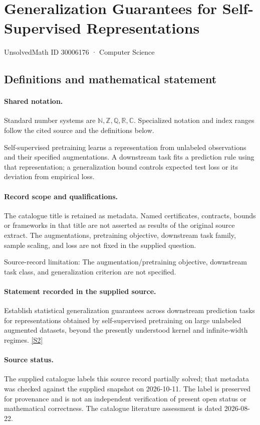 \documentclass[11pt]{article}
\newcommand{\sref}[2]{\hyperlink{source:#1:#2}{[S#2]}}
\begin{document}
\setcounter{section}{30006175}
\section{Generalization Guarantees for Self-Supervised Representations}\label{30006176}
{\small\sffamily UnsolvedMath ID 30006176 · Computer Science}
\subsection{Definitions and mathematical statement}

\paragraph{Shared notation.}Standard number systems are $\mathbb N,\mathbb Z,\mathbb Q,\mathbb R,\mathbb C$. Specialized notation and index ranges follow the cited source and the definitions below.


Self-supervised pretraining learns a representation from unlabeled observations and their specified augmentations. A downstream task fits a prediction rule using that representation; a generalization bound controls expected test loss or its deviation from empirical loss.
\paragraph{Record scope and qualifications.}
The catalogue title is retained as metadata. Named certificates, contracts, bounds or frameworks in that title are not asserted as results of the original source extract.
The augmentations, pretraining objective, downstream task family, sample scaling, and loss are not fixed in the supplied question.

Source-record limitation: The augmentation/pretraining objective, downstream task class, and generalization criterion are not specified.
\paragraph{Statement recorded in the supplied source.}
Establish statistical generalization guarantees across downstream prediction tasks for representations obtained by self-supervised pretraining on large unlabeled augmented datasets, beyond the presently understood kernel and infinite-width regimes. \sref{30006176}{2}
\paragraph{Source status.}
The supplied catalogue labels this source record partially solved; that metadata was checked against the supplied snapshot on 2026-10-11. The label is preserved for provenance and is not an independent verification of present open status or mathematical correctness. The catalogue literature assessment is dated 2026-08-22.
\end{document}
